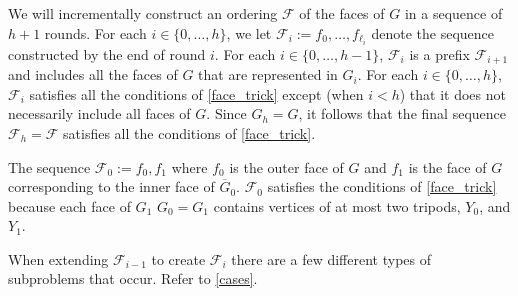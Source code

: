 \documentclass{patmorin}
\begin{document}
We will incrementally construct an ordering $\mathcal{F}$ of the faces of $G$ in a sequence of $h+1$ rounds.  For each $i\in\{0,\ldots,h\}$, we let $\mathcal{F}_i:=f_0,\ldots,f_{\ell_i}$ denote the sequence constructed by the end of round $i$.  For each $i\in\{0,\ldots,h-1\}$, $\mathcal{F}_i$ is a prefix $\mathcal{F}_{i+1}$ and includes all the faces of $G$ that are represented in $G_i$.  For each $i\in\{0,\ldots,h\}$, $\mathcal{F}_i$ satisfies all the conditions of \cref{face_trick} except (when  $i<h$) that it does not necessarily include all faces of $G$.   Since $G_h=G$, it follows that the final sequence $\mathcal{F}_h=\mathcal{F}$ satisfies all the conditions of \cref{face_trick}.

The sequence $\mathcal{F}_0:=f_0,f_1$ where $f_0$ is the outer face of $G$ and $f_1$ is the face of $G$ corresponding to the inner face of $\overline{G}_0$. $\mathcal{F}_0$ satisfies the conditions of \cref{face_trick} because each face of $G_1$ $G_0=G_1$ contains vertices of at most two tripods, $Y_0$, and $Y_1$.

When extending $\mathcal{F}_{i-1}$ to create $\mathcal{F}_{i}$ there are a few different types of subproblems that occur.  Refer to \cref{cases}.
\end{document}

